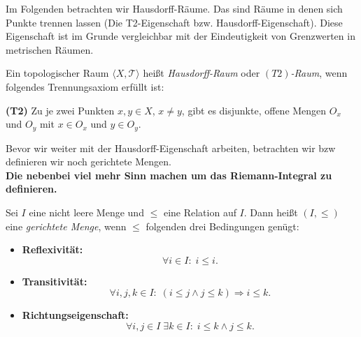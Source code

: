 
 Im Folgenden betrachten wir Hausdorff-Räume. Das sind 
 Räume in denen sich Punkte trennen lassen 
 (Die T2-Eigenschaft bzw. Hausdorff-Eigenschaft). Diese Eigenschaft ist 
 im Grunde vergleichbar mit der Eindeutigkeit von Grenzwerten in
 metrischen Räumen.

{
Ein topologischer Raum $\langle X, \mathcal{T} \rangle$
heißt \emph{Hausdorff-Raum} oder \emph{$(T2)$-Raum}, 
wenn folgendes Trennungsaxiom erfüllt ist:
\begin{center}
    \textbf{(T2)} \quad 
    Zu je zwei Punkten $x, y \in X$, $x \neq y$, gibt es disjunkte, offene Mengen 
    $O_x$ und $O_y$ mit $x \in O_x$ und $y \in O_y$.
\end{center}
}

Bevor wir weiter mit der Hausdorff-Eigenschaft arbeiten, betrachten wir
bzw definieren wir noch gerichtete Mengen.\\
\textbf{Die nebenbei viel mehr Sinn machen um das Riemann-Integral zu definieren.}

{
    Sei $I$ eine nicht leere Menge und $\leq$ eine Relation auf $I$. 
Dann heißt $(I, \leq)$ eine \textit{gerichtete Menge}, wenn $\leq$ folgenden drei Bedingungen genügt:

\begin{itemize}
    \item[\textbullet] \textbf{Reflexivität:} \\
    $$\forall i \in I : \; i \leq i.$$

    \item[\textbullet] \textbf{Transitivität:} \\
    $$\forall i, j, k \in I : \; (i \leq j \land j \leq k) \Rightarrow i \leq k.$$

    \item[\textbullet] \textbf{Richtungseigenschaft:} \\
    $$\forall i, j \in I \; \exists k \in I : \; i \leq k \land j \leq k.$$
\end{itemize}
}

